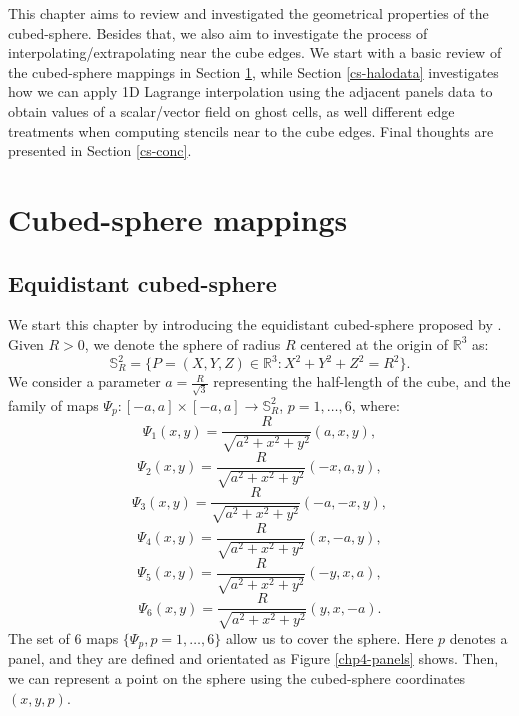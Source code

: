 This chapter aims to review and investigated the geometrical properties
of the cubed-sphere. Besides that, we also aim to investigate the process
of interpolating/extrapolating near the cube edges.
We start with a basic review of the cubed-sphere mappings in Section \ref{cs-mappings},
while Section \ref{cs-halodata} investigates how we can apply 1D Lagrange interpolation using the adjacent panels
data to obtain values of a scalar/vector field on ghost cells, as well different edge
treatments when computing stencils near to the cube edges.
Final thoughts are presented in Section \ref{cs-conc}.

\section{Cubed-sphere mappings}
\label{cs-mappings}
\subsection{Equidistant cubed-sphere}
\label{equidistant-cs}
We start this chapter by introducing the equidistant cubed-sphere proposed by 
\citet{sadourny:1972}. Given $R>0$, we denote the sphere of radius $R$ 
centered at the origin of  $\mathbb{R}^3$ as:
\begin{equation*}
	\mathbb{S}^2_R = \{ P = (X,Y,Z) \in \mathbb{R}^3: X^2 + Y^2 + Z^2 = R^2\}.
\end{equation*}
We consider a parameter $a = \frac{R}{\sqrt{3}}$ representing the half-length of 
the cube, and the family of maps
$\Psi_{p}: [-a,a] \times [-a,a] \to \mathbb{S}^2_R$, $p=1, \ldots, 6$,
where:
\begin{equation*}
	\Psi_{1}(x,y) = \frac{R}{\sqrt{a^2 + x^2 + y^2}}(a, x, y), 
\end{equation*}
\begin{equation*}
	\Psi_{2}(x,y) = \frac{R}{\sqrt{a^2 + x^2 + y^2}}(-x, a, y), 
\end{equation*}
\begin{equation*}
	\Psi_{3}(x,y) = \frac{R}{\sqrt{a^2 + x^2 + y^2}}(-a, -x, y), 
\end{equation*}
\begin{equation*}
	\Psi_{4}(x,y) = \frac{R}{\sqrt{a^2 + x^2 + y^2}}(x, -a, y), 
\end{equation*}
\begin{equation*}
	\Psi_{5}(x,y) = \frac{R}{\sqrt{a^2 + x^2 + y^2}}(-y, x, a), 
\end{equation*}
\begin{equation*}
	\Psi_{6}(x,y) = \frac{R}{\sqrt{a^2 + x^2 + y^2}}(y, x, -a).
\end{equation*}
The set of 6 maps $\{\Psi_{p}, p = 1, \ldots, 6\}$ allow us to cover the sphere.
Here $p$ denotes a panel, and they are defined and orientated as Figure \ref{chp4-panels}
shows. Then, we can represent a point on the sphere using the cubed-sphere coordinates
$(x,y,p)$.

